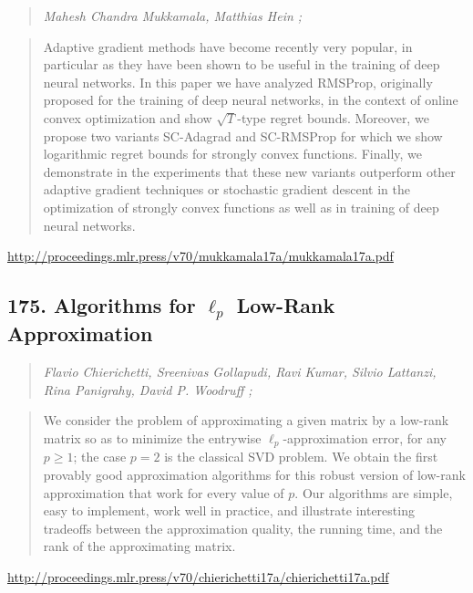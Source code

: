 \documentclass{article}
\begin{document}
\begin{quote}
\footnotesize{\textit{Mahesh Chandra Mukkamala, Matthias Hein ;}}

\end{quote}

\begin{quote}
    Adaptive gradient methods have become recently very popular, in particular as they have been shown to be useful in the training of deep neural networks. In this paper we have analyzed RMSProp, originally proposed for the training of deep neural networks, in the context of online convex optimization and show $\sqrt{T}$-type regret bounds. Moreover, we propose two variants SC-Adagrad and SC-RMSProp for which we show logarithmic regret bounds for strongly convex functions. Finally, we demonstrate in the experiments that these new variants outperform other adaptive gradient techniques or stochastic gradient descent in the optimization of strongly convex functions as well as in training of deep neural networks.  
\end{quote}

\href{http://proceedings.mlr.press/v70/mukkamala17a/mukkamala17a.pdf}{http://proceedings.mlr.press/v70/mukkamala17a/mukkamala17a.pdf}

\subsection{175. Algorithms for $\ell_p$ Low-Rank Approximation}

\begin{quote}
\footnotesize{\textit{Flavio Chierichetti, Sreenivas Gollapudi, Ravi Kumar, Silvio Lattanzi, Rina Panigrahy, David P. Woodruff ;}}

\end{quote}

\begin{quote}
    We consider the problem of approximating a given matrix by a low-rank matrix so as to minimize the entrywise $\ell_p$-approximation error, for any $p \geq 1$; the case $p = 2$ is the classical SVD problem. We obtain the first provably good approximation algorithms for this robust version of low-rank approximation that work for every value of $p$. Our algorithms are simple, easy to implement, work well in practice, and illustrate interesting tradeoffs between the approximation quality, the running time, and the rank of the approximating matrix.  
\end{quote}

\href{http://proceedings.mlr.press/v70/chierichetti17a/chierichetti17a.pdf}{http://proceedings.mlr.press/v70/chierichetti17a/chierichetti17a.pdf}
\end{document}
